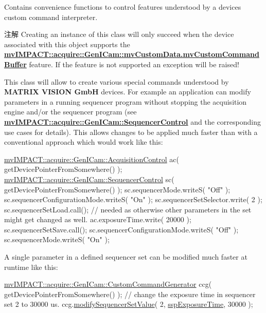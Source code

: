 Contains convenience functions to control features understood by a devices custom command interpreter. \begin{DoxyNote}{注解}
Creating an instance of this class will only succeed when the device associated with this object supports the {\bfseries \hyperlink{classmv_i_m_p_a_c_t_1_1acquire_1_1_gen_i_cam_1_1mv_custom_data_a9cff7474eda237a796fb506f10ba775b}{mv\+I\+M\+P\+A\+C\+T\+::acquire\+::\+Gen\+I\+Cam\+::mv\+Custom\+Data.\+mv\+Custom\+Command\+Buffer}} feature. If the feature is not supported an exception will be raised!
\end{DoxyNote}
This class will allow to create various special commands understood by {\bfseries M\+A\+T\+R\+I\+X V\+I\+S\+I\+O\+N Gmb\+H} devices. For example an application can modify parameters in a running sequencer program without stopping the acquisition engine and/or the sequencer program (see {\bfseries \hyperlink{classmv_i_m_p_a_c_t_1_1acquire_1_1_gen_i_cam_1_1_sequencer_control}{mv\+I\+M\+P\+A\+C\+T\+::acquire\+::\+Gen\+I\+Cam\+::\+Sequencer\+Control}} and the corresponding use cases for details). This allows changes to be applied much faster than with a conventional approach which would work like this\+: 
\begin{DoxyCode}
\hyperlink{classmv_i_m_p_a_c_t_1_1acquire_1_1_gen_i_cam_1_1_acquisition_control}{mvIMPACT::acquire::GenICam::AcquisitionControl} ac( 
      getDevicePointerFromSomewhere() );
\hyperlink{classmv_i_m_p_a_c_t_1_1acquire_1_1_gen_i_cam_1_1_sequencer_control}{mvIMPACT::acquire::GenICam::SequencerControl} sc( 
      getDevicePointerFromSomewhere() );
sc.sequencerMode.writeS( \textcolor{stringliteral}{"Off"} );
sc.sequencerConfigurationMode.writeS( \textcolor{stringliteral}{"On"} );
sc.sequencerSetSelector.write( 2 );
sc.sequencerSetLoad.call(); \textcolor{comment}{// needed as otherwise other parameters in the set might get changed as well.}
ac.exposureTime.write( 20000 );
sc.sequencerSetSave.call();
sc.sequencerConfigurationMode.writeS( \textcolor{stringliteral}{"Off"} );
sc.sequencerMode.writeS( \textcolor{stringliteral}{"On"} );
\end{DoxyCode}


A single parameter in a defined sequencer set can be modified much faster at runtime like this\+:


\begin{DoxyCode}
\hyperlink{classmv_i_m_p_a_c_t_1_1acquire_1_1_gen_i_cam_1_1_custom_command_generator}{mvIMPACT::acquire::GenICam::CustomCommandGenerator} ccg( 
      getDevicePointerFromSomewhere() );
\textcolor{comment}{// change the exposure time in sequencer set 2 to 30000 us.}
ccg.\hyperlink{classmv_i_m_p_a_c_t_1_1acquire_1_1_gen_i_cam_1_1_custom_command_generator_ad692d5d184f37b146f3da67faf1da770}{modifySequencerSetValue}( 2, \hyperlink{group___gen_i_cam_interface_gga458c2281fb19ba32fa6a49b02e0a976da23cbccf7c89a18488ab68d5c16fe7519}{sspExposureTime}, 30000 );
\end{DoxyCode}



